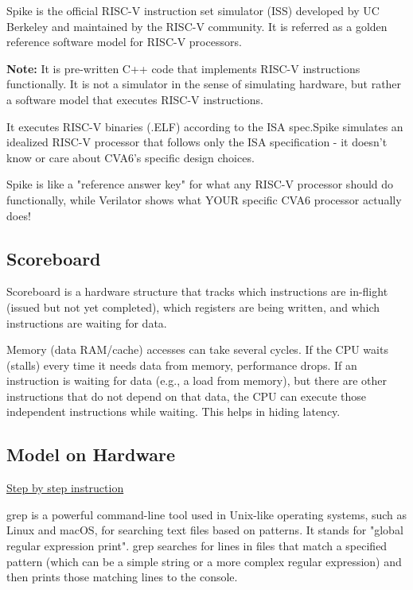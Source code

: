 \documentclass[12pt, a4paper]{article}
\begin{document}
Spike is the official RISC-V instruction set simulator (ISS) developed by UC Berkeley and maintained by the RISC-V community. It is referred as a golden reference software model for RISC-V processors. 

\vspace{0.5em}

\textbf{Note:} It is pre-written C++ code that implements RISC-V instructions functionally. It is not a simulator in the sense of simulating hardware, but rather a software model that executes RISC-V instructions.

\vspace{0.5em}

It executes RISC-V binaries (.ELF) according to the ISA spec.Spike simulates an idealized RISC-V processor that follows only the ISA specification - it doesn't know or care about CVA6's specific design choices.

Spike is like a "reference answer key" for what any RISC-V processor should do functionally, while Verilator shows what YOUR specific CVA6 processor actually does!

\subsection{Scoreboard}

Scoreboard is a hardware structure that tracks which instructions are in-flight (issued but not yet completed), which registers are being written, and which instructions are waiting for data.

Memory (data RAM/cache) accesses can take several cycles. If the CPU waits (stalls) every time it needs data from memory, performance drops. If an instruction is waiting for data (e.g., a load from memory), but there are other instructions that do not depend on that data, the CPU can execute those independent instructions while waiting. This helps in hiding latency.

\subsection{Model on Hardware}

\href{https://chatgpt.com/share/686529ac-6b08-8005-98f3-5291aa6a2816}{Step by step instruction}

grep is a powerful command-line tool used in Unix-like operating systems, such as Linux and macOS, for searching text files based on patterns. It stands for "global regular expression print". grep searches for lines in files that match a specified pattern (which can be a simple string or a more complex regular expression) and then prints those matching lines to the console.
\end{document}
